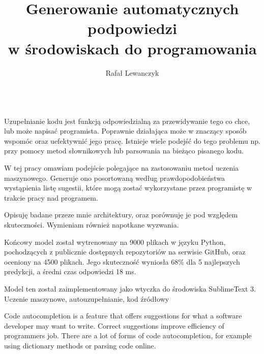 \documentclass[
    left=2.5cm,         %
    right=2.5cm,        %
    top=2.5cm,          %
    bottom=3cm,         %
    bindingoffset=6mm,  %
    nohyphenation=false %
]{eiti/eiti-thesis}
\begin{document}
\EngineerThesis %
{}
\title{
    Generowanie automatycznych podpowiedzi \\w środowiskach do programowania
}
\author{Rafał Lewanczyk}
\date{\the\year}
\maketitle

\cleardoublepage %
\streszczenie \\
Uzupełnianie kodu jest funkcją odpowiedzialną za przewidywanie tego co chce, lub może napisać programista. Poprawnie 
działająca może w znaczący sposób wspomóc oraz uefektywnić jego pracę. Istnieje wiele podejść do tego 
problemu np. przy pomocy metod słownikowych lub parsowania na bieżąco pisanego kodu. 

W tej pracy omawiam podejście polegające na zastosowaniu metod uczenia
maszynowego. Generuje ono posortowaną według prawdopodobieństwa wystąpienia listę sugestii, które mogą zostać wykorzystane 
przez programistę w trakcie pracy nad programem. 

Opisuję badane przeze mnie architektury, oraz porównuję je pod względem skuteczności. Wymieniam 
również napotkane wyzwania. 

Końcowy model został wytrenowany na 9000 plikach w języku Python, pochodzących z publicznie dostępnych 
repozytoriów na serwisie GitHub, oraz oceniony na 4500 plikach. Jego skuteczność wyniosła 
\begin{math}68\%\end{math} dla 5 najlepszych predykcji, a średni czas odpowiedzi 18 ms. 

Model ten został zaimplementowany jako wtyczka do środowiska SublimeText 3. 
\slowakluczowe Uczenie maszynowe, autouzupełnianie, kod źródłowy

\newpage
\abstract
Code autocompletion is a feature that offers suggestions for what a software developer may want 
to write. Correct suggestions improve efficiency of programmers job. There are a lot of forms 
of code autocompletion, for example using dictionary methods or parsing code online. 
\end{document}
